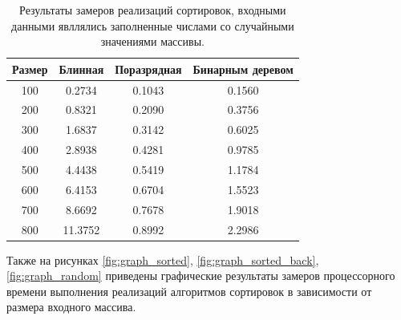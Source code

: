 \begin{table}[h]
	\begin{center}
		\begin{threeparttable}
		\captionsetup{justification=raggedright,singlelinecheck=off}
		\caption{Результаты замеров реализаций сортировок, входными данными явллялись заполненные числами со случайными значениями массивы.}
		\label{tbl:random}
		\begin{tabular}{|c|c|c|c|}
			\hline
			 Размер & Блинная &  Поразрядная &  Бинарным деревом \\
			\hline
			100 & 0.2734 & 0.1043 & 0.1560 \\ 
			\hline
			200 & 0.8321 & 0.2090 & 0.3756 \\ 
			\hline
			300 & 1.6837 & 0.3142 & 0.6025 \\ 
			\hline
			400 & 2.8938 & 0.4281 & 0.9785 \\ 
			\hline
			500 & 4.4438 & 0.5419 & 1.1784 \\ 
			\hline
			600 & 6.4153 & 0.6704 & 1.5523 \\ 
			\hline
			700 & 8.6692 & 0.7678 & 1.9018 \\ 
			\hline
			800 & 11.3752 & 0.8992 & 2.2986 \\ 
			\hline
		\end{tabular}
		\end{threeparttable}
    \end{center}
\end{table}

\newpage

Также на рисунках \ref{fig:graph_sorted}, \ref{fig:graph_sorted_back}, \ref{fig:graph_random} приведены графические результаты замеров процессорного времени выполнения реализаций алгоритмов сортировок в зависимости от размера входного массива.

